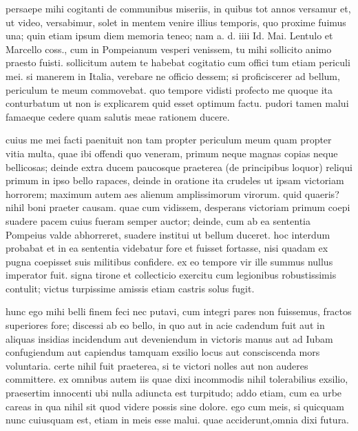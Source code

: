 


 persaepe mihi cogitanti de communibus miseriis, in quibus tot annos versamur et, ut video, versabimur, solet in mentem venire illius temporis, quo proxime fuimus una; quin etiam ipsum diem memoria teneo; nam a. d. iiii Id. Mai. Lentulo et Marcello coss., cum in Pompeianum vesperi venissem, tu mihi sollicito animo praesto fuisti. sollicitum autem te habebat cogitatio cum offici tum etiam periculi mei. si manerem in Italia, verebare ne officio dessem; si proficiscerer ad bellum, periculum te meum commovebat. quo tempore vidisti profecto me quoque ita conturbatum ut non is explicarem quid esset optimum factu. pudori tamen malui famaeque cedere quam salutis meae rationem ducere.

 cuius me mei facti paenituit non tam propter periculum meum quam propter vitia multa, quae ibi offendi quo veneram, primum neque magnas copias neque bellicosas; deinde extra ducem paucosque praeterea (de principibus loquor) reliqui primum in ipso bello rapaces, deinde in oratione ita crudeles ut ipsam victoriam horrorem; maximum autem aes alienum amplissimorum virorum. quid quaeris? nihil boni praeter causam. quae cum vidissem, desperans victoriam primum coepi suadere pacem cuius fueram semper auctor; deinde, cum ab ea sententia Pompeius valde abhorreret, suadere institui ut bellum duceret. hoc interdum probabat et in ea sententia videbatur fore et fuisset fortasse, nisi quadam ex pugna coepisset suis militibus confidere. ex eo tempore vir ille summus nullus imperator fuit. signa tirone et collecticio exercitu cum legionibus robustissimis contulit; victus turpissime amissis etiam castris solus fugit.

 hunc ego mihi belli finem feci nec putavi, cum integri pares non fuissemus, fractos superiores fore; discessi ab eo bello, in quo aut in acie cadendum fuit aut in aliquas insidias incidendum aut deveniendum in victoris manus aut ad Iubam confugiendum aut capiendus tamquam exsilio locus aut consciscenda mors voluntaria. certe nihil fuit praeterea, si te victori nolles aut non auderes committere. ex omnibus autem iis quae dixi incommodis nihil tolerabilius exsilio, praesertim innocenti ubi nulla adiuncta est turpitudo; addo etiam, cum ea urbe careas in qua nihil sit quod videre possis sine dolore. ego cum meis, si quicquam nunc cuiusquam est, etiam in meis esse malui. quae acciderunt,omnia dixi futura.

